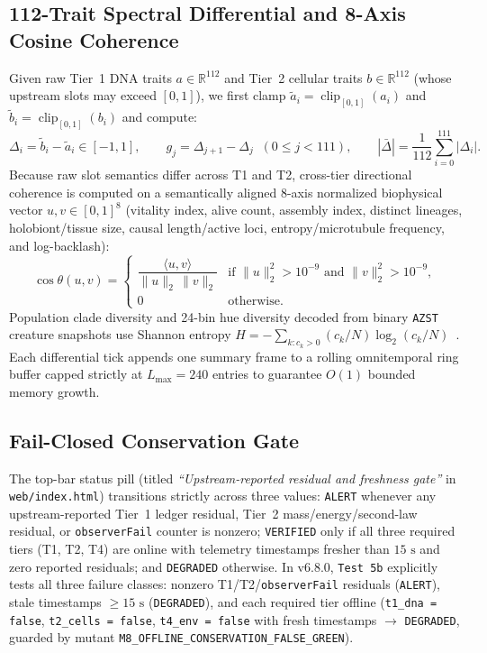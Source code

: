 \documentclass[11pt,reqno]{amsart}
\theoremstyle{definition}
\newcommand{\code}[1]{{\footnotesize\nolinkurl{#1}}}
\begin{document}
\subsection{112-Trait Spectral Differential and 8-Axis Cosine Coherence}
Given raw Tier~1 DNA traits $a \in \mathbb{R}^{112}$ and Tier~2 cellular traits $b \in \mathbb{R}^{112}$ (whose upstream slots may exceed $[0,1]$), we first clamp $\tilde{a}_i = \operatorname{clip}_{[0,1]}(a_i)$ and $\tilde{b}_i = \operatorname{clip}_{[0,1]}(b_i)$ and compute:
\begin{equation}
  \Delta_i = \tilde{b}_i - \tilde{a}_i \in [-1, 1], \qquad
  g_j = \Delta_{j+1} - \Delta_j \;\;(0 \le j < 111), \qquad
  |\bar{\Delta}| = \frac{1}{112}\sum_{i=0}^{111} |\Delta_i|.
  \label{eq:delta112}
\end{equation}
Because raw slot semantics differ across T1 and T2, cross-tier directional coherence is computed on a semantically aligned 8-axis normalized biophysical vector $u, v \in [0, 1]^8$ (vitality index, alive count, assembly index, distinct lineages, holobiont/tissue size, causal length/active loci, entropy/microtubule frequency, and log-backlash):
\begin{equation}
  \cos\theta(u, v) =
  \begin{cases}
    \dfrac{\langle u, v \rangle}{\|u\|_2 \, \|v\|_2} & \text{if } \|u\|_2^2 > 10^{-9} \text{ and } \|v\|_2^2 > 10^{-9}, \\[8pt]
    0 & \text{otherwise.}
  \end{cases}
  \label{eq:cos8}
\end{equation}
Population clade diversity and 24-bin hue diversity decoded from binary \code{AZST} creature snapshots use Shannon entropy $H = -\sum_{k: c_k > 0} (c_k / N) \log_2 (c_k / N)$~\cite{shannon1948}. Each differential tick appends one summary frame to a rolling omnitemporal ring buffer capped strictly at $L_{\max} = 240$ entries to guarantee $O(1)$ bounded memory growth.

\subsection{Fail-Closed Conservation Gate}
The top-bar status pill (titled \emph{``Upstream-reported residual and freshness gate''} in \code{web/index.html}) transitions strictly across three values: \code{ALERT} whenever any upstream-reported Tier~1 ledger residual, Tier~2 mass/energy/second-law residual, or \code{observerFail} counter is nonzero; \code{VERIFIED} only if all three required tiers (T1, T2, T4) are online with telemetry timestamps fresher than $15\text{ s}$ and zero reported residuals; and \code{DEGRADED} otherwise. In v6.8.0, \code{Test 5b} explicitly tests all three failure classes: nonzero T1/T2/\code{observerFail} residuals (\code{ALERT}), stale timestamps $\ge 15\text{ s}$ (\code{DEGRADED}), and each required tier offline (\code{t1\_dna = false}, \code{t2\_cells = false}, \code{t4\_env = false} with fresh timestamps $\to$ \code{DEGRADED}, guarded by mutant \code{M8\_OFFLINE\_CONSERVATION\_FALSE\_GREEN}).
\end{document}
